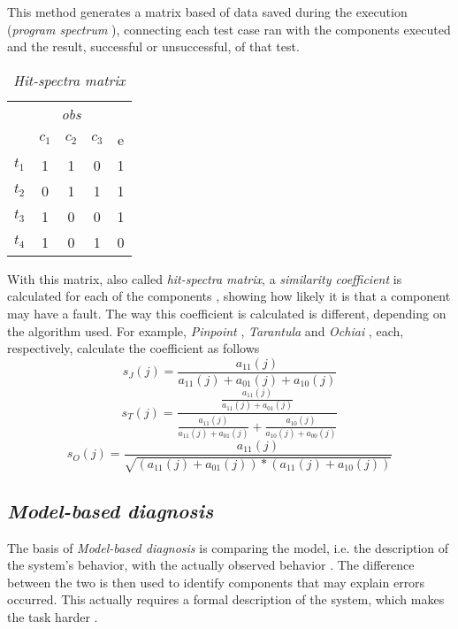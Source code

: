 This method generates a matrix based of data saved during the execution (\emph{program spectrum} \cite{Reps1997}), connecting each test case ran with the components executed and the result, successful or unsuccessful, of that test.

\begin{table}[H]
  \centering
  \begin{tabular}{c|ccc|c}
    & \multicolumn{3}{c|}{\textit{obs}} &  \\
    & $c_1$ & $c_2$ & $c_3$ & e \\
    \hline
    $t_1$ & 1 & 1 & 0 & 1 \\
    $t_2$ & 0 & 1 & 1 & 1 \\
    $t_3$ & 1 & 0 & 0 & 1 \\
    $t_4$ & 1 & 0 & 1 & 0 \\
  \end{tabular}
  \caption{\emph{Hit-spectra matrix}}
  \label{tab:hit-spectra}
\end{table}

With this matrix, also called \emph{hit-spectra matrix}, a \emph{similarity coefficient} is calculated for each of the components \cite{Abreu2009}, showing how likely it is that a component may have a fault. The way this coefficient is calculated is different, depending on the algorithm used. For example, \emph{Pinpoint} \cite{Chen2002}, \emph{Tarantula} \cite{Jones2005} and \emph{Ochiai} \cite{Abreu2007}, each, respectively, calculate the coefficient as follows
%
\begin{equation}
  s_J(j) = \frac {a_{11}(j)} {a_{11}(j) + a_{01}(j) + a_{10}(j)}
\end{equation}
%
\begin{equation}
  s_T(j) = \frac  { \frac {a_{11}(j)} {a_{11}(j) + a_{01}(j)} }
          { \frac{a_{11}(j)}{a_{11}(j) + a_{01}(j)} + \frac{a_{10}(j)}{a_{10}(j) + a_{00}(j)}}
\end{equation}
%
\begin{equation}
  s_O(j) = \frac  {a_{11}(j)}
          {\sqrt{(a_{11}(j) + a_{01}(j)) * (a_{11}(j) + a_{10}(j))}}
\end{equation}


%
%

\subsection{\emph{Model-based diagnosis}}

The basis of \emph{Model-based diagnosis} is comparing the model, i.e. the description of the system's behavior, with the actually observed behavior \cite{Mayer2008}. The difference between the two is then used to identify components that may explain errors occurred. This actually requires a formal description of the system,  which makes the task harder \cite{Perez2004}.

